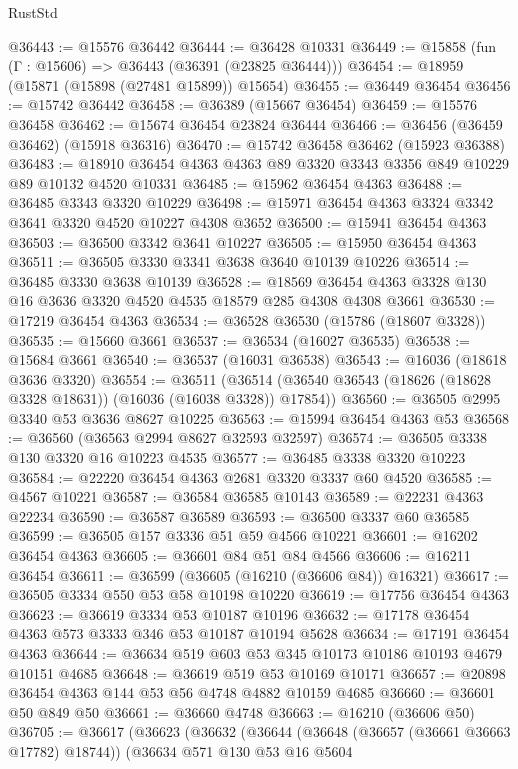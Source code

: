 \begin{lexlean}{RustStd}
\begin{coremodule}
@36443 := @15576 @36442
@36444 := @36428 @10331
@36449 := @15858 (fun (Γ : @15606) => @36443 (@36391 (@23825 @36444)))
@36454 := @18959 (@15871 (@15898 (@27481 @15899)) @15654)
@36455 := @36449 @36454
@36456 := @15742 @36442
@36458 := @36389 (@15667 @36454)
@36459 := @15576 @36458
@36462 := @15674 @36454 @23824 @36444
@36466 := @36456 (@36459 @36462) (@15918 @36316)
@36470 := @15742 @36458 @36462 (@15923 @36388)
@36483 := @18910 @36454 @4363 @4363 @89 @3320 @3343 @3356 @849 @10229 @89 @10132 @4520 @10331
@36485 := @15962 @36454 @4363
@36488 := @36485 @3343 @3320 @10229
@36498 := @15971 @36454 @4363 @3324 @3342 @3641 @3320 @4520 @10227 @4308 @3652
@36500 := @15941 @36454 @4363
@36503 := @36500 @3342 @3641 @10227
@36505 := @15950 @36454 @4363
@36511 := @36505 @3330 @3341 @3638 @3640 @10139 @10226
@36514 := @36485 @3330 @3638 @10139
@36528 := @18569 @36454 @4363 @3328 @130 @16 @3636 @3320 @4520 @4535 @18579 @285 @4308 @4308 @3661
@36530 := @17219 @36454 @4363
@36534 := @36528 @36530 (@15786 (@18607 @3328))
@36535 := @15660 @3661
@36537 := @36534 (@16027 @36535)
@36538 := @15684 @3661
@36540 := @36537 (@16031 @36538)
@36543 := @16036 (@18618 @3636 @3320)
@36554 := @36511
    (@36514 (@36540 @36543 (@18626 (@18628 @3328 @18631)) (@16036 (@16038 @3328)) @17854))
@36560 := @36505 @2995 @3340 @53 @3636 @8627 @10225
@36563 := @15994 @36454 @4363 @53
@36568 := @36560 (@36563 @2994 @8627 @32593 @32597)
@36574 := @36505 @3338 @130 @3320 @16 @10223 @4535
@36577 := @36485 @3338 @3320 @10223
@36584 := @22220 @36454 @4363 @2681 @3320 @3337 @60 @4520
@36585 := @4567 @10221
@36587 := @36584 @36585 @10143
@36589 := @22231 @4363 @22234
@36590 := @36587 @36589
@36593 := @36500 @3337 @60 @36585
@36599 := @36505 @157 @3336 @51 @59 @4566 @10221
@36601 := @16202 @36454 @4363
@36605 := @36601 @84 @51 @84 @4566
@36606 := @16211 @36454
@36611 := @36599 (@36605 (@16210 (@36606 @84)) @16321)
@36617 := @36505 @3334 @550 @53 @58 @10198 @10220
@36619 := @17756 @36454 @4363
@36623 := @36619 @3334 @53 @10187 @10196
@36632 := @17178 @36454 @4363 @573 @3333 @346 @53 @10187 @10194 @5628
@36634 := @17191 @36454 @4363
@36644 := @36634 @519 @603 @53 @345 @10173 @10186 @10193 @4679 @10151 @4685
@36648 := @36619 @519 @53 @10169 @10171
@36657 := @20898 @36454 @4363 @144 @53 @56 @4748 @4882 @10159 @4685
@36660 := @36601 @50 @849 @50
@36661 := @36660 @4748
@36663 := @16210 (@36606 @50)
@36705 := @36617
    (@36623
      (@36632
        (@36644
          (@36648 (@36657 (@36661 @36663 @17782) @18744))
          (@36634
            @571
            @130
            @53
            @16
            @5604

\end{coremodule}
\end{lexlean}
